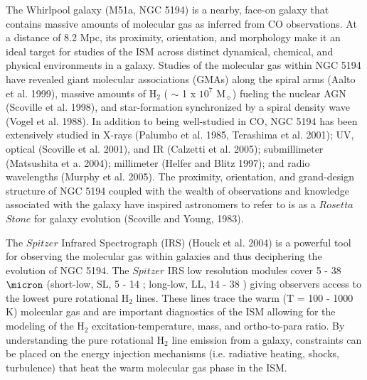 \documentclass[manuscript]{aastex}
\begin{document}
The Whirlpool galaxy (M51a, NGC 5194) is a nearby, face-on galaxy that contains massive amounts of molecular gas as inferred from CO observations.  At a distance of 8.2 Mpc, its proximity, orientation, and morphology make it an ideal target for studies of the ISM across distinct dynamical, chemical, and physical environments in a galaxy.  Studies of the molecular gas within NGC 5194 have revealed giant molecular associations (GMAs) along the spiral arms (Aalto et al. 1999), massive amounts of $\mathrm{H_2}$ ( $\sim$ 1 x ${10^{7}}$ $\mathrm{M_\sun}$) fueling the nuclear AGN (Scoville et al. 1998), and star-formation synchronized by a spiral density wave (Vogel et al. 1988).  In addition to being well-studied in CO, NGC 5194 has been extensively studied in X-rays (Palumbo et al. 1985,  Terashima et al. 2001); UV, optical (Scoville et al. 2001), and IR (Calzetti et al. 2005); submillimeter (Matsushita et a. 2004); millimeter (Helfer and Blitz 1997); and radio wavelengths (Murphy et al. 2005).   The proximity, orientation, and grand-design structure of NGC 5194 coupled with the wealth of observations and knowledge associated with the galaxy have inspired astronomers to refer to is as a $Rosetta$ $Stone$ for galaxy evolution (Scoville and Young, 1983).  

The $Spitzer$ Infrared Spectrograph (IRS) (Houck et al. 2004) is a powerful tool for observing the molecular gas within galaxies and thus deciphering the evolution of NGC 5194.  The $Spitzer$ IRS low resolution modules cover 5 - 38 $\micron$ (short-low, SL, 5 - 14 \micron; long-low, LL, 14 - 38 \micron) giving observers access to the lowest pure rotational $\mathrm{H_2}$ lines. These lines trace the warm (T = 100 - 1000 K) molecular gas and are important diagnostics of the ISM allowing for the modeling of the $\mathrm{H_2}$ excitation-temperature, mass, and ortho-to-para ratio.  By understanding the pure rotational $\mathrm{H_2}$ line emission from a galaxy, constraints can be placed on the energy injection mechanisms (i.e. radiative heating, shocks, turbulence) that heat the warm molecular gas phase in the ISM.
\end{document}
